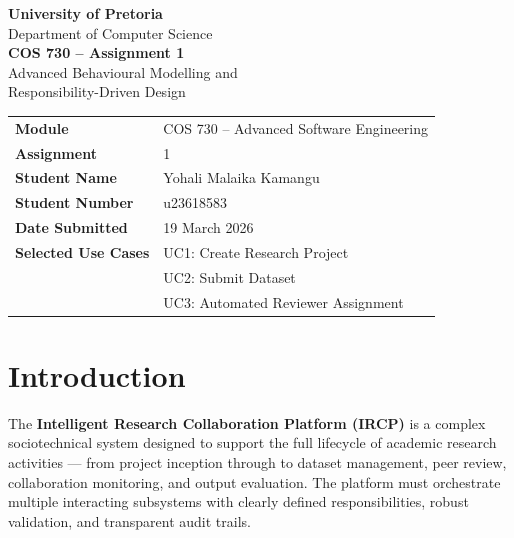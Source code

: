 \documentclass[12pt,a4paper]{article}
\begin{document}
\begin{titlepage}
  \centering
  \vspace*{1.5cm}

  {\LARGE\bfseries\sffamily University of Pretoria}\\[0.4em]
  {\large\sffamily Department of Computer Science}\\[3.5cm]

  {\huge\bfseries COS 730 -- Assignment 1}\\[0.6em]
  {\LARGE\sffamily Advanced Behavioural Modelling and\\[0.3em]
   Responsibility-Driven Design}\\[3cm]

  \begin{tabular}{@{}ll@{}}
    \textbf{Module}            & COS 730 -- Advanced Software Engineering \\[0.5em]
    \textbf{Assignment}        & 1 \\[0.5em]
    \textbf{Student Name}      & Yohali Malaika Kamangu \\[0.5em]
    \textbf{Student Number}    & u23618583 \\[0.5em]
    \textbf{Date Submitted}    & 19 March 2026 \\[0.5em]
    \textbf{Selected Use Cases}& UC1: Create Research Project \\
                               & UC2: Submit Dataset \\
                               & UC3: Automated Reviewer Assignment \\
  \end{tabular}

  \vfill
\end{titlepage}

\tableofcontents
\newpage
{}

\section{Introduction}

The \textbf{Intelligent Research Collaboration Platform (IRCP)} is a complex sociotechnical system designed to support the full lifecycle of academic research activities --- from project inception through to dataset management, peer review, collaboration monitoring, and output evaluation. The platform must orchestrate multiple interacting subsystems with clearly defined responsibilities, robust validation, and transparent audit trails.
\end{document}
